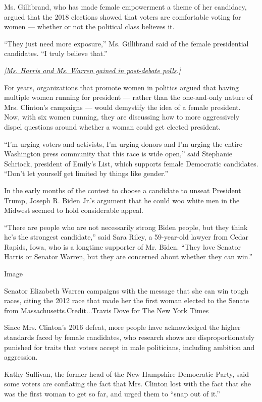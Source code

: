 Ms. Gillibrand, who has made female empowerment a theme of her
candidacy, argued that the 2018 elections showed that voters are
comfortable voting for women --- whether or not the political class
believes it.

``They just need more exposure,'' Ms. Gillibrand said of the female
presidential candidates. ``I truly believe that.''

\emph{{[}}\href{https://www.nytimes3xbfgragh.onion/2019/07/02/us/politics/kamala-harris-polls.html}{\emph{Ms.
Harris and Ms. Warren gained in post-debate polls}}\emph{.{]}}

For years, organizations that promote women in politics argued that
having multiple women running for president --- rather than the
one-and-only nature of Mrs. Clinton's campaigns --- would demystify the
idea of a female president. Now, with six women running, they are
discussing how to more aggressively dispel questions around whether a
woman could get elected president.

``I'm urging voters and activists, I'm urging donors and I'm urging the
entire Washington press community that this race is wide open,'' said
Stephanie Schriock, president of Emily's List, which supports female
Democratic candidates. ``Don't let yourself get limited by things like
gender.''

In the early months of the contest to choose a candidate to unseat
President Trump, Joseph R. Biden Jr.'s argument that he could woo white
men in the Midwest seemed to hold considerable appeal.

``There are people who are not necessarily strong Biden people, but they
think he's the strongest candidate,'' said Sara Riley, a 59-year-old
lawyer from Cedar Rapids, Iowa, who is a longtime supporter of Mr.
Biden. ``They love Senator Harris or Senator Warren, but they are
concerned about whether they can win.''

Image

Senator Elizabeth Warren campaigns with the message that she can win
tough races, citing the 2012 race that made her the first woman elected
to the Senate from Massachusetts.Credit...Travis Dove for The New York
Times

Since Mrs. Clinton's 2016 defeat, more people have acknowledged the
higher standards faced by female candidates, who research shows are
disproportionately punished for traits that voters accept in male
politicians, including ambition and aggression.

Kathy Sullivan, the former head of the New Hampshire Democratic Party,
said some voters are conflating the fact that Mrs. Clinton lost with the
fact that she was the first woman to get so far, and urged them to
``snap out of it.''

